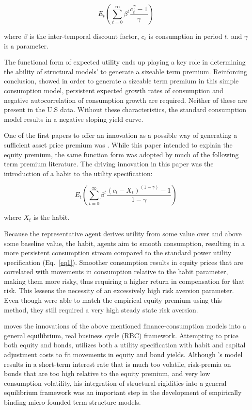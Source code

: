\documentclass{article}
\numberwithin{equation}{section}
\begin{document}
\begin{equation}
  E_t(\sum_{t=0}^\infty{\beta^t\frac{c_t^\gamma-1}{\gamma}})
  \label{eq1}
\end{equation}

where $\beta$ is the inter-temporal discount factor, $c_t$ is consumption in
period $t$, and $\gamma$ is a parameter.

The functional form of expected utility ends up playing a key role in
determining the ability of structural models' to generate a sizeable term
premium. Reinforcing \citeauthor*{donaldsonetal1990} conclusion,
\citet{denhaan1995} showed in order to generate a sizeable term premium in this
simple consumption model, persistent expected growth rates of consumption and
negative autocorrelation of consumption growth are required. Neither of these
are present in the U.S data. Without these characteristics, the standard
consumption model results in a negative sloping yield curve.

One of the first papers to offer an innovation as a possible way of generating
a sufficient asset price premium was \citet{campbellcochrane1999}. While this
paper intended to explain the equity premium, the same function form was
adopted by much of the following term premium literature. The driving
innovation in this paper was the introduction of a habit to the utility
specification:

\begin{equation}
  E_t(\sum_{t=0}^\infty{\beta^t\frac{(c_t-X_t)^(1-\gamma)-1}{1-\gamma}})
  \label{eq2}
\end{equation}

where $X_t$ is the habit.

Because the representative agent derives utility from some value over and above
some baseline value, the habit, agents aim to smooth consumption, resulting in
a more persistent consumption stream compared to the standard power utility
specification (Eq.~\ref{eq1}). Smoother consumption results in equity prices
that are correlated with movements in consumption relative to the habit
parameter, making them more risky, thus requiring a higher return in
compensation for that risk. This lessens the necessity of an excessively high
risk aversion parameter. Even though \citeauthor{campbellcochrane1999} were
able to match the empirical equity premium using this method, they still
required a very high steady state risk aversion. 

\citet{jermann1998} moves the innovations of the above mentioned
finance-consumption models into a general equilibrium, real business cycle
(RBC) framework. Attempting to price both equity and bonds,
\citeauthor{jermann1998} utilizes both a utility specification with habit and
capital adjustment costs to fit movements in equity and bond yields. Although
\citeauthor{jermann1998}'s model results in a short-term interest rate that is
much too volatile, risk-premia on bonds that are too high relative to the
equity premium, and very low consumption volatility, his integration of
structural rigidities into a general equilibrium framework was an important
step in the development of empirically binding micro-founded term structure
models.
\end{document}
